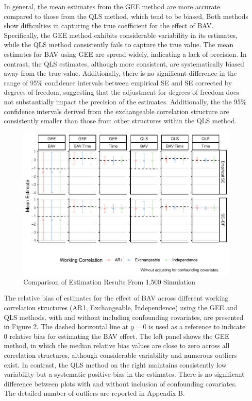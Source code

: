 \documentclass[
]{aft}
\begin{document}
In general, the mean estimates from the GEE method are more accurate
compared to those from the QLS method, which tend to be biased. Both
methods show difficulties in capturing the true coefficient for the
effect of BAV. Specifically, the GEE method exhibits considerable
variability in its estimates, while the QLS method consistently fails to
capture the true value. The mean estimates for BAV using GEE are spread
widely, indicating a lack of precision. In contrast, the QLS estimates,
although more consistent, are systematically biased away from the true
value. Additionally, there is no significant difference in the range of
95\% confidence intervals between empirical SE and SE corrected by
degrees of freedom, suggesting that the adjustment for degrees of
freedom does not substantially impact the precision of the estimates.
Additionally, the the 95\% confidence intervals derived from the
exchangeable correlation structure are consistently smaller than those
from other structures within the QLS method.

\begin{figure}[H]

{\centering \includegraphics{FinalReport_files/figure-pdf/unnamed-chunk-6-1.pdf}

}

\caption{Comparison of Estimation Results From 1,500 Simulation}

\end{figure}%

The relative bias of estimates for the effect of BAV across different
working correlation structures (AR1, Exchangeable, Independence) using
the GEE and QLS methods, with and without including confounding
covariates, are presented in Figure 2. The dashed horizontal line at
\(y = 0\) is used as a reference to indicate 0 relative bias for
estimating the BAV effect. The left panel shows the GEE method, in which
the median relative bias values are close to zero across all correlation
structures, although considerable variability and numerous outliers
exist. In contrast, the QLS method on the right maintains consistently
low variability but a systematic positive bias in the estimates. There
is no significant difference between plots with and without inclusion of
confounding covariates. The detailed number of outliers are reported in
Appendix B.
\end{document}
